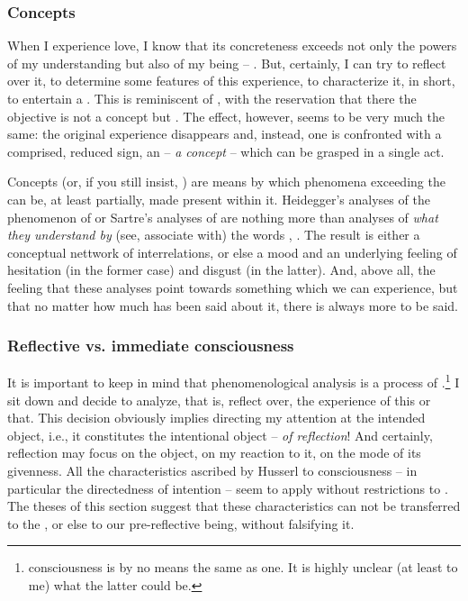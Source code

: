 \subsubsection{Concepts}
When I experience love, I know that its concreteness exceeds not only the powers 
of my understanding but also of my being -- . But, certainly, I can try to reflect over it, to determine some  
features of this experience, to characterize it, in short, to entertain 
a . This is reminiscent of 
, with the reservation that there the objective is not a 
concept but . The effect, however, seems to 
be very much the same: the original experience disappears and, 
instead, one is confronted with a comprised, reduced sign, an 
 -- {\em a concept} -- which can be grasped in a single act.
 
Concepts (or, if you still insist, ) are 
means by which phenomena exceeding the  can be, at 
least partially, made present within it. 
Heidegger's analyses of the phenomenon of  or 
Sartre's analyses of 
are nothing more than analyses of {\em what they understand by} (see, 
associate with) the words , . The result is either a 
conceptual nettwork of interrelations, or else a mood and an underlying 
feeling of hesitation (in the former case) and disgust (in the 
latter). And, above all, the feeling that these analyses point towards something
which we can experience, but that no matter how much has been 
said about it, there is always more to be said.

\subsubsection{Reflective vs. immediate consciousness}
It is important to keep in mind that phenomenological analysis is a 
process of .\footnote{ 
consciousness is by no means the same as  one. It is 
highly unclear (at least to me) what the latter could be.} 
I sit down and decide to 
analyze, that is, reflect over, the experience of this or that. This 
decision obviously implies directing my attention at the intended 
object, i.e., it constitutes the intentional object -- {\em of 
reflection\/}! And certainly, reflection may focus on the object, 
on my reaction to it, on the mode of its givenness. All the 
characteristics ascribed by Husserl to consciousness -- in particular 
the directedness of intention -- seem to apply 
without restrictions to . The theses of 
this section suggest that these characteristics can not be 
transferred to the , or else to our 
pre-reflective being, without falsifying it.

